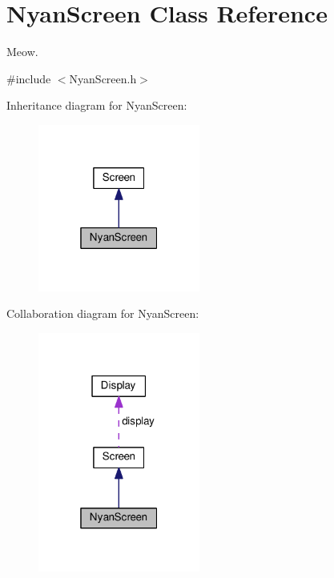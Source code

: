 \hypertarget{classNyanScreen}{}\section{Nyan\+Screen Class Reference}
\label{classNyanScreen}


Meow.  




{\ttfamily \#include $<$Nyan\+Screen.\+h$>$}



Inheritance diagram for Nyan\+Screen\+:\nopagebreak
\begin{figure}[H]
\begin{center}
\leavevmode
\includegraphics[width=151pt]{classNyanScreen__inherit__graph}
\end{center}
\end{figure}


Collaboration diagram for Nyan\+Screen\+:
\nopagebreak
\begin{figure}[H]
\begin{center}
\leavevmode
\includegraphics[width=151pt]{classNyanScreen__coll__graph}
\end{center}
\end{figure}
